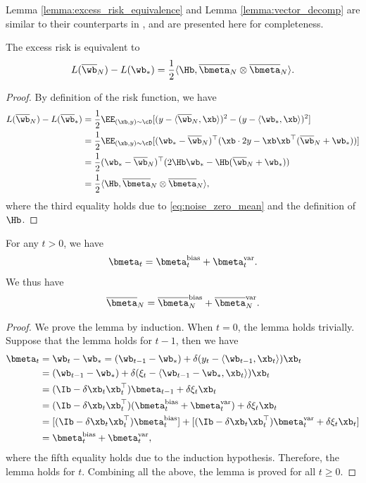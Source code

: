 \documentclass[11pt]{article}
\newcommand{\owb}{\overline{\wb}}
\newcommand{\obmeta}{\overline{\bmeta}}
\begin{document}
Lemma \ref{lemma:excess_risk_equivalence} and Lemma \ref{lemma:vector_decomp} are similar to their counterparts in \citet{zou2021benign}, and are presented here for completeness.

\begin{lemma}\label{lemma:excess_risk_equivalence}
The excess risk is equivalent to
\begin{align*}
L(\owb_N)-L(\wb_*)=\frac12\langle\Hb, \obmeta_N\otimes\obmeta_N\rangle.
\end{align*}
\end{lemma}
\begin{proof}
By definition of the risk function, we have
\begin{align*}
L(\owb_N)-L(\owb_*)&=\frac12\EE_{(\xb, y)\sim\cD}[(y-\langle\owb_N, \xb\rangle)^2-(y-\langle\wb_*, \xb\rangle)^2]\\
&=\frac12\EE_{(\xb, y)\sim\cD}[(\wb_*-\owb_N)^\top(\xb\cdot 2y-\xb\xb^\top(\owb_N+\wb_*))]\\
&=\frac12(\wb_*-\owb_N)^\top(2\Hb\wb_*-\Hb(\owb_N+\wb_*))\\
&=\frac12\langle\Hb, \obmeta_N\otimes\obmeta_N\rangle,
\end{align*}
where the third equality holds due to \eqref{eq:noise_zero_mean} and the definition of $\Hb$.
\end{proof}

\begin{lemma}\label{lemma:vector_decomp}
For any $t>0$, we have
\begin{align*}
\bmeta_t=\bmeta_t^{\mathrm{bias}}+\bmeta_t^{\mathrm{var}}.
\end{align*}
We thus have
\begin{align*}
\obmeta_N=\obmeta_N^{\mathrm{bias}}+\obmeta_N^{\mathrm{var}}.
\end{align*}
\end{lemma}
\begin{proof}
We prove the lemma by induction. When $t=0$, the lemma holds trivially. Suppose that the lemma holds for $t-1$, then we have
\begin{align*}
\bmeta_t&=\wb_t-\wb_*=(\wb_{t-1}-\wb_*)+\delta(y_t-\langle\wb_{t-1}, \xb_t\rangle)\xb_t\\
&=(\wb_{t-1}-\wb_*)+\delta(\xi_t-\langle\wb_{t-1}-\wb_*, \xb_t\rangle)\xb_t\\
&=(\Ib-\delta\xb_t\xb_t^\top)\bmeta_{t-1}+\delta\xi_t\xb_t\\
&=(\Ib-\delta\xb_t\xb_t^\top)(\bmeta_t^{\mathrm{bias}}+\bmeta_t^{\mathrm{var}})+\delta\xi_t\xb_t\\
&=[(\Ib-\delta\xb_t\xb_t^\top)\bmeta_t^{\mathrm{bias}}]+[(\Ib-\delta\xb_t\xb_t^\top)\bmeta_t^{\mathrm{var}}+\delta\xi_t\xb_t]\\
&=\bmeta_t^{\mathrm{bias}}+\bmeta_t^{\mathrm{var}},
\end{align*}
where the fifth equality holds due to the induction hypothesis. Therefore, the lemma holds for $t$. Combining all the above, the lemma is proved for all $t\ge0$.
\end{proof}
\end{document}
